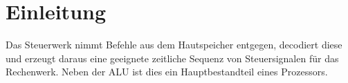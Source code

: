 \chapter{Einleitung}
\label{chap:einleitung}

Das Steuerwerk nimmt Befehle aus dem Hautspeicher entgegen, decodiert diese und erzeugt daraus eine geeignete zeitliche Sequenz von
Steuersignalen für das Rechenwerk. Neben der ALU ist dies ein Hauptbestandteil eines Prozessors.